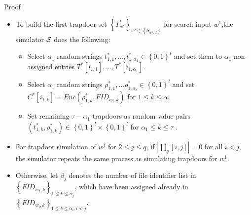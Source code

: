 \documentclass[handout]{beamer}
\begin{document}
\begin{frame}{Proof}
	\begin{itemize}
		\item To build the first trapdoor set ${\left\{ {T_{w'}^*} \right\}_{w' \in \left\{ {{S_{{w^1},d}}} \right\}}}$ for search input $w^1$,the simulator $\cal S$ does the following:
		\begin{itemize}
			\item<2-> Select ${\alpha_1}$ random strings $t_{1,1}^*, \ldots ,t_{1,{\alpha _1}}^* \in {\left\{ {0,1} \right\}^l}$ and set them to ${\alpha _1}$ non-assigned entries ${T^*}[{i_{1,1}}], \ldots ,{T^*}[{i_{1,{\alpha _1}}}]$.
			\item<3-> Select ${\alpha_1}$ random strings $\rho _{1,1}^*, \ldots \rho _{1,{\alpha _i}}^* \in {\left\{ {0,1} \right\}^l}$ and set ${C^*}[{i_{1,k}}] = Enc(\rho _{1,k}^*,FI{D_{{w_i},k}})$ for $1 \le k \le {\alpha _1}$
			\item<4-> Set remaining $\tau  - {\alpha _1}$ trapdoors as random value pairs
			$(t_{1,k}^*,\rho _{1,k}^*) \in {\left\{ {0,1} \right\}^l} \times {\left\{ {0,1} \right\}^l}$ for ${\alpha _1} \le k \le \tau $ .
		\end{itemize}
		\item<5-> For trapdoor simulation of $w^j$ for $2 \le j \le q$, if $\left| {{\prod _q}[i,j]} \right| = 0$ for all $i < j$, the simulator repeats the same process as
		simulating trapdoors for $w^1$.
		\item<6-> Otherwise, let ${\beta _j}$ denotes the number of file identifier list in ${\left\{ {FI{D_{{w_j},k}}} \right\}_{1 \le k \le {\alpha _j}}}$, which have
		been assigned already in ${\left\{ {FI{D_{{w_i},k}}} \right\}_{1 \le k \le {\alpha _i},i < j}}$.
	\end{itemize}
\end{frame}
\end{document}
